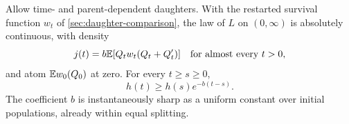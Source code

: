 \begin{theorem}
\label{thm:general-last-density}
Allow time- and parent-dependent daughters. With the restarted
survival function $w_t$ of \cref{sec:daughter-comparison}, the law of
$L$ on $(0,\infty)$ is absolutely continuous, with density
\begin{equation}
 j(t)=b\mathbb E[Q_t w_t(Q_t+Q'_t)]
 \quad\text{for almost every }t>0,
 \label{eq:general-last-density}
\end{equation}
and atom $\mathbb E w_0(Q_0)$ at zero. For every $t\geq s\geq0$,
\begin{equation}
 h(t)\geq h(s)e^{-b(t-s)}.
 \label{eq:lower-calendar-tail}
\end{equation}
The coefficient $b$ is instantaneously sharp as a uniform constant
over initial populations, already within equal splitting.
\end{theorem}

